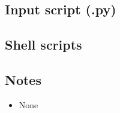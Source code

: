 \bigskip
\subsection{Input script (.py)}
\topbar

\bottombar

\subsection{Shell scripts}
\label{couette-flow-2D-sh-files}
\topbar

\bottombar

\subsection{Notes}
\begin{itemize}
\item None
\end{itemize}


